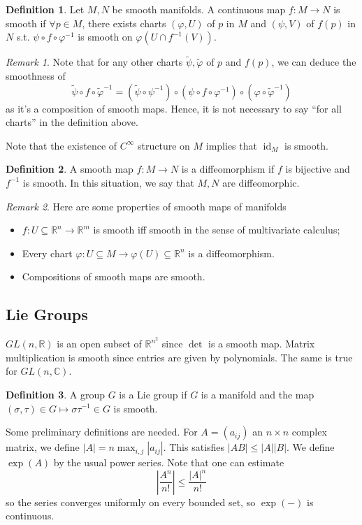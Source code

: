 \documentclass{article}
\theoremstyle{definition}
\newtheorem{defn}{Definition}[section]
\theoremstyle{remark}
\newtheorem{rem}{Remark}
\theoremstyle{plain}
\newcommand{\RR}{\mathbb{R}}
\newcommand{\CC}{\mathbb{C}}
\begin{document}
\begin{defn}
    Let $M,N$ be smooth manifolds. A continuous map $f:M\to N$ is smooth if $\forall p\in M$, there exists charts $(\varphi, U)$ of $p$ in $M$ and $(\psi,V)$ of $f(p)$ in $N$ s.t. $\psi\circ f\circ\varphi^{-1}$ is smooth on $\varphi(U\cap f^{-1}(V))$.
\end{defn}
\begin{rem}
    Note that for any other charts $\tilde\psi,\tilde\varphi$ of $p$ and $f(p)$, we can deduce the smoothness of
    \[\tilde\psi\circ f\circ\tilde\varphi^{-1}=(\tilde\psi\circ\psi^{-1})\circ(\psi\circ f\circ\varphi^{-1})\circ(\varphi\circ\tilde\varphi^{-1})\]
    as it's a composition of smooth maps. Hence, it is not necessary to say ``for all charts'' in the definition above.
\end{rem}
Note that the existence of $C^\infty$ structure on $M$ implies that $\operatorname{id}_M$ is smooth.
\begin{defn}
    A smooth map $f:M\to N$ is a diffeomorphism if $f$ is bijective and $f^{-1}$ is smooth. In this situation, we say that $M,N$ are diffeomorphic.
\end{defn}
\begin{rem}
    Here are some properties of smooth maps of manifolds
    \begin{itemize}
        \item $f:U\subseteq\RR^n\to\RR^m$ is smooth iff smooth in the sense of multivariate calculus;
        \item Every chart $\varphi:U\subseteq M\to\varphi(U)\subseteq\RR^n$ is a diffeomorphism.
        \item Compositions of smooth maps are smooth.
    \end{itemize}
\end{rem}

\subsection{Lie Groups}
$GL(n,\RR)$ is an open subset of $\RR^{n^2}$ since $\det$ is a smooth map. Matrix multiplication is smooth since entries are given by polynomials. The same is true for $GL(n,\CC)$.
\begin{defn}
    A group $G$ is a Lie group if $G$ is a manifold and the map $(\sigma,\tau)\in G\mapsto\sigma\tau^{-1}\in G$ is smooth.
\end{defn}
Some preliminary definitions are needed. For $A=(a_{ij})$ an $n\times n$ complex matrix, we define $|A|=n\max_{i,j}|a_{ij}|$. This satisfies $|AB|\le|A||B|$. We define $\exp(A)$ by the usual power series. Note that one can estimate \[\left|\dfrac{A^n}{n!}\right|\le \dfrac{|A|^n}{n!}\] so the series converges uniformly on every bounded set, so $\exp(-)$ is continuous.
\end{document}
